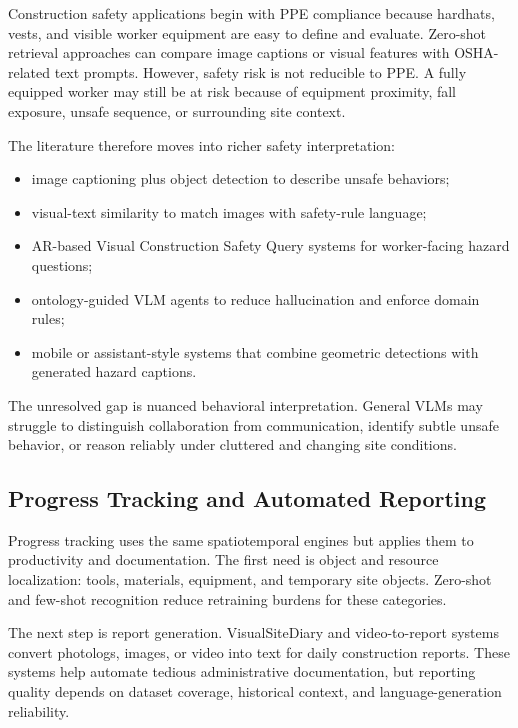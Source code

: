 \documentclass[10pt,letterpaper]{article}
\begin{document}
Construction safety applications begin with PPE compliance because hardhats, vests, and visible worker equipment are easy to define and evaluate. Zero-shot retrieval approaches can compare image captions or visual features with OSHA-related text prompts. However, safety risk is not reducible to PPE. A fully equipped worker may still be at risk because of equipment proximity, fall exposure, unsafe sequence, or surrounding site context.

The literature therefore moves into richer safety interpretation:

\begin{itemize}
\item image captioning plus object detection to describe unsafe behaviors;
\item visual-text similarity to match images with safety-rule language;
\item AR-based Visual Construction Safety Query systems for worker-facing hazard questions;
\item ontology-guided VLM agents to reduce hallucination and enforce domain rules;
\item mobile or assistant-style systems that combine geometric detections with generated hazard captions.
\end{itemize}

The unresolved gap is nuanced behavioral interpretation. General VLMs may struggle to distinguish collaboration from communication, identify subtle unsafe behavior, or reason reliably under cluttered and changing site conditions.

\subsection{Progress Tracking and Automated Reporting}

Progress tracking uses the same spatiotemporal engines but applies them to productivity and documentation. The first need is object and resource localization: tools, materials, equipment, and temporary site objects. Zero-shot and few-shot recognition reduce retraining burdens for these categories.

The next step is report generation. VisualSiteDiary and video-to-report systems convert photologs, images, or video into text for daily construction reports. These systems help automate tedious administrative documentation, but reporting quality depends on dataset coverage, historical context, and language-generation reliability.
\end{document}
